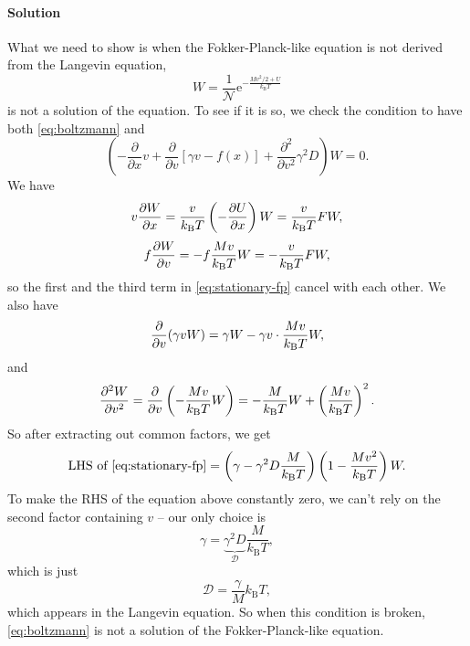 \documentclass[hyperref, a4paper]{article}
\newcommand*{\ee}{\mathrm{e}}
\begin{document}
\paragraph{Solution} What we need to show is when the Fokker-Planck-like equation is not derived 
from the Langevin equation,
\begin{equation}
    W = \frac{1}{\mathcal{N}} \ee^{- \frac{M v^2 / 2 + U}{k_{\text{B}} T}}
    \label{eq:boltzmann}
\end{equation}
is not a solution of the equation.
To see if it is so, we check the condition to have both \eqref{eq:boltzmann} and 
\begin{equation}
    \left(-\frac{\partial}{\partial x} v+\frac{\partial}{\partial v}[\gamma v-f(x)]+\frac{\partial^2}{\partial v^2} \gamma^2 D\right) W = 0.
    \label{eq:stationary-fp}
\end{equation}
We have 
\[
    v \pdv{W}{x} = \frac{v}{k_{\text{B}} T} \left( - \pdv{U}{x} \right) W = \frac{v}{k_{\text{B}} T} F W, 
\]
\[
    f \pdv{W}{v} = - f \frac{M v}{k_{\text{B}} T} W = - \frac{v}{k_{\text{B}} T} F W,
\]
so the first and the third term in \eqref{eq:stationary-fp} cancel with each other.
We also have 
\[
    \pdv{v} (\gamma v W) = \gamma W - \gamma v \cdot \frac{M v}{k_{\text{B}} T} W,
\]
and 
\[
    \pdv[2]{W}{v} = \pdv{v} \left( - \frac{M v}{k_{\text{B}} T} W \right) 
    = - \frac{M}{k_{\text{B}} T} W + \left( \frac{M v}{k_{\text{B}} T} \right)^2.
\]
So after extracting out common factors, we get 
\begin{equation}
    \text{LHS of \eqref{eq:stationary-fp}} = \left( \gamma - \gamma^2 D \frac{M}{k_{\text{B}} T} \right) 
    \left(1 - \frac{M v^2}{k_{\text{B}} T}\right) W.
\end{equation}
To make the RHS of the equation above constantly zero,
we can't rely on the second factor containing $v$ -- our only choice is 
\[
    \gamma = \underbrace{\gamma^2 D}_{\mathcal{D}} \frac{M}{k_{\text{B}} T},
\]
which is just 
\begin{equation}
    \mathcal{D} = \frac{\gamma}{M} k_{\text{B}} T,
\end{equation}
which appears in the Langevin equation.
So when this condition is broken, \eqref{eq:boltzmann} is not a solution of the Fokker-Planck-like equation.



\end{document}
